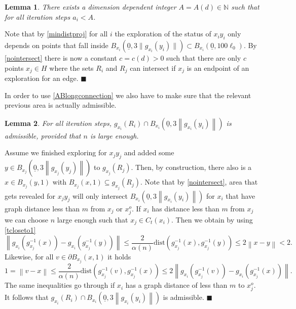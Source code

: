 \documentclass[11pt]{article}%
\newenvironment{proof}{\vspace{1ex}\noindent{\bf Proof.}}{\hspace*{\fill}$\blacksquare$\vspace{1ex}}
\newtheorem{lemma}[lemma]{Lemma}
\newcommand{\norm}[1]{\ensuremath{\left\|#1\right\|}}
\newcommand{\NN}{\mathbb{N}}
\newcommand{\dists}{{\mathrm{dist}}}
\newcommand{\typ}{\underline{0}}
\begin{document}
	\begin{lemma}\label{independentexpl}
		There exists a dimension dependent integer $ A=A(d)\in \NN $ such that for all iteration steps $ a_{i}<A$.
	\end{lemma}	
	\begin{proof}
		Note that by \cref{mindistproj} for all $ i $ the exploration of the status of $ x_iy_i $ only depends on points that fall inside $ B_{x_i}(\typ,3\lVert g_{x_i}(y_i)\rVert)\subset B_{x_i}(\typ,100 \ell_0) $. By \cref{nointersect} there is now a constant $ c=c(d)>0 $ such that there are only $ c $ points $ x_j\in H $ where  the sets $ R_i $ and $ R_j $ can intersect if $ x_j $ is an endpoint of an exploration for an edge.
		\end{proof}

 \noindent       
In order to use \cref{ABlongconnection} we also have to make sure that the relevant previous area is actually admissible. 
\begin{lemma}\label{admissible}
	For all iteration steps, $ g_{x_i}(R_i)\cap B_{x_i}(\typ,3\norm{g_{x_i}(y_i)}) $ is admissible, provided that $n$ is large enough.
\end{lemma}
\begin{proof}
	Assume we finished exploring for $ x_jy_j $ and added some $ y\in B_{x_j}(\typ,3\norm{g_{x_j}(y_j)}) $ to  $ g_{x_j}(R_j) $. Then, by construction, there also is a $ x\in B_{x_j}(y,1) $ with $ B_{x_j}(x,1)\subseteq g_{x_j}(R_j)  $. Note that by \cref{nointersect}, area that gets revealed for $ x_jy_j $ will only intersect $ B_{x_i}(\typ,3\norm{g_{x_i}(y_i)}) $ for $ x_i $ that have graph distance less than $ m $ from $ x_j $ or $ x_j^o $. If $ x_i $ has distance less than $ m $ from $ x_j $ we can choose $ n $ large enough such that $ x_j\in C_t(x_i) $. Then we obtain by using \cref{tcloseto1}
	\begin{equation*}
		\norm{g_{x_i}(g^{-1}_{x_j}(x))-g_{x_i}(g^{-1}_{x_j}(y))}\leq \frac{2}{\alpha(n)}\dists(g_{x_j}^{-1}(x),g_{x_j}^{-1}(y))\leq 2 \norm{x-y}<2.
	\end{equation*}
	Likewise, for all $ v\in \partial B_{x_j}(x,1) $ it holds
	\begin{equation*}
		1=\norm{v-x}\leq \frac{2}{\alpha(n)}\dists(g_{x_j}^{-1}(v),g_{x_j}^{-1}(x))\leq {2}\norm{g_{x_i}(g_{x_j}^{-1}(v))-g_{x_i}(g_{x_j}^{-1}(x))}.
	\end{equation*}
	The same inequalities go through if $x_i  $ has a graph distance of less than $m $ to $ x_j^o $. 
	It follows that $ g_{x_i}(R_i)\cap B_{x_i}(\typ,3\norm{g_{x_i}(y_i)}) $ is admissible.
\end{proof}
\end{document}
